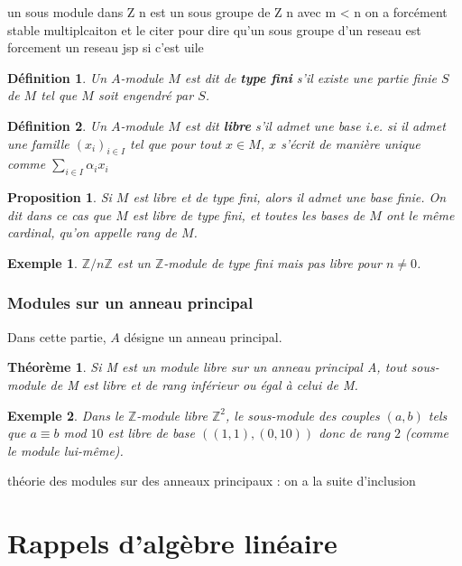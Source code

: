 \documentclass[a4paper,12pt]{report}  %
\theoremstyle{definitionstyle}
\newtheorem{definition}{Définition}[chapter] %
\theoremstyle{examplestyle}
\newtheorem{example}{Exemple}[chapter] %
\theoremstyle{remarkstyle}
\theoremstyle{propositionstyle}
\newtheorem{proposition}{Proposition}[chapter]  %
\theoremstyle{theoremstyle}
\newtheorem{theoreme}{Théorème}[chapter]  %
\theoremstyle{proofstyle}
\begin{document}
	
	un sous module dans Z n est un sous groupe de Z n avec m < n on a forcément stable multiplcaiton et le citer pour dire qu'un sous groupe d'un reseau est forcement un reseau jsp si c'est uile
	
	\begin{definition}
		Un $A$-module $M$ est dit de \textbf{type fini} s'il existe une partie finie $S$ de $M$ tel que $M$ soit engendré par $S$.
	\end{definition}

	\begin{definition}
		Un $A$-module $M$ est dit \textbf{libre} s'il admet une base i.e. si il admet une famille $(x_i)_{i \in I}$ tel que pour tout $x \in M$, $x$ s'écrit de manière unique comme $\sum_{i \in I} \alpha_i x_i$
	\end{definition}

	\begin{proposition}
		Si $M$ est libre et de type fini, alors il admet une base finie. On dit dans ce cas que $M$ est libre de type fini, et toutes les bases de $M$ ont le même cardinal, qu'on appelle rang de $M$.
	\end{proposition}

	\begin{example}
		$\mathbb{Z}/n \mathbb{Z}$ est un $\mathbb{Z}$-module de type fini mais pas libre pour $n \neq 0$.
	\end{example}
		
	\subsection{Modules sur un anneau principal}
	Dans cette partie, $A$ désigne un anneau principal.
	
	\begin{theoreme}
	Si M est un module libre sur un anneau principal A, tout sous-module de M est libre et de rang inférieur ou égal à celui de M.
	\end{theoreme}


	\begin{example}
		Dans le $\mathbb{Z}$-module libre $\mathbb{Z}^2$, le sous-module des couples $(a, b)$ tels que $a \equiv b$ mod $10$ est libre de base $((1,1), (0, 10))$ donc de rang $2$ (comme le module lui-même).
	\end{example}
	
	
	théorie des modules sur des anneaux principaux : on a la suite d'inclusion
	\chapter{Rappels d'algèbre linéaire}
	
\end{document}
